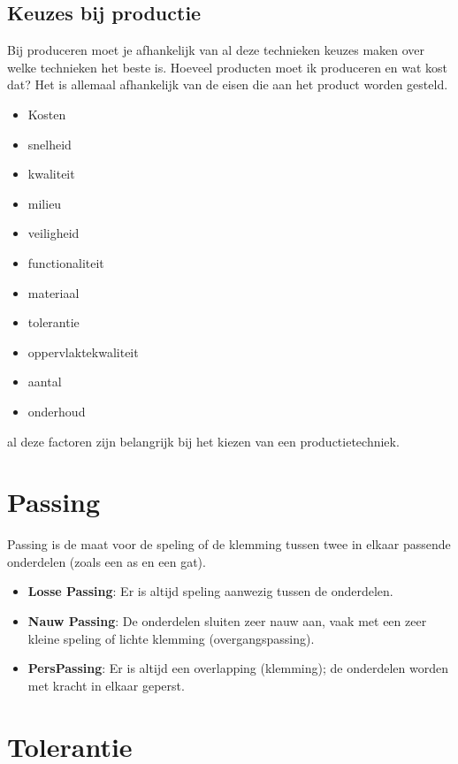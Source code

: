 \documentclass[a4paper,12pt,twoside]{report}
\begin{document}
\subsection{Keuzes bij productie}

Bij produceren moet je afhankelijk van al deze technieken
keuzes maken over welke technieken het beste is. Hoeveel producten
moet ik produceren en wat kost dat? Het is allemaal afhankelijk
van de eisen die aan het product worden gesteld.

\begin{itemize}
	\item Kosten
	\item snelheid
	\item kwaliteit
	\item milieu
	\item veiligheid
	\item functionaliteit
	\item materiaal
	\item tolerantie
	\item oppervlaktekwaliteit
	\item aantal
	\item onderhoud
\end{itemize}

al deze factoren zijn belangrijk bij het kiezen van een productietechniek.


\section{Passing}

\begin{conceptbox}[title=Passing]
    Passing is de maat voor de speling of de klemming tussen twee in elkaar passende onderdelen (zoals een as en een gat).
\end{conceptbox}

\begin{itemize}
	\item \textbf{Losse Passing}: Er is altijd speling aanwezig tussen de onderdelen.
	\item \textbf{Nauw Passing}: De onderdelen sluiten zeer nauw aan, vaak met een zeer kleine speling of lichte klemming (overgangspassing).
	\item \textbf{PersPassing}: Er is altijd een overlapping (klemming); de onderdelen worden met kracht in elkaar geperst.
\end{itemize}

\section{Tolerantie}
\end{document}
